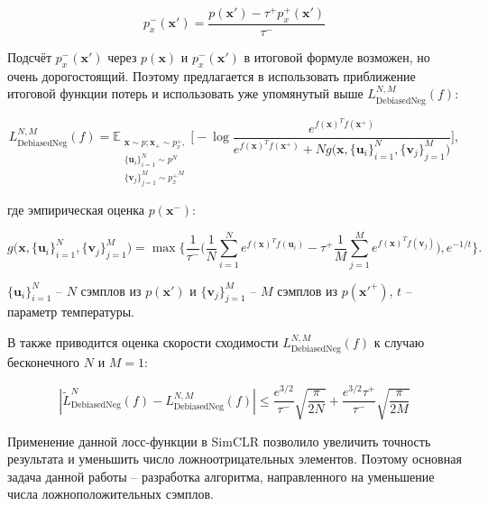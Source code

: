 \documentclass[a4paper, 12pt]{article}
\begin{document}
\begin{equation} \label{eq:4}
p_x^-(\textbf{x}') = \frac{p(\textbf{x}') - \tau^+ p^+_x(\textbf{x}')}{\tau^-}
\end{equation}

Подсчёт $p^-_x(\textbf{x}')$ через $p(\mathbf{x})$ и $p^-_x(\textbf{x}')$ в итоговой формуле возможен, но очень дорогостоящий. Поэтому предлагается в \citep{chuang2020debiased} использовать приближение итоговой функции потерь и использовать уже упомянутый выше $L_{\text{DebiasedNeg}}^{N, M}(f)$:

\begin{equation}\label{eq:5}
L_{\text{DebiasedNeg}}^{N, M}(f) = \mathbb{E}_{\substack{\textbf{x} \sim p; \textbf{x}_+ \sim p_x^+,\\ \{\textbf{u}_i\}_{i=1}^N \sim p^N \\ \{\textbf{v}_j\}_{j=1}^M \sim {p_x^+}^M}}  \bigg[ -\log \frac{e^{f(\textbf{x})^T f(\textbf{x}^+)} }{e^{f(\textbf{x})^T f(\textbf{x}^+)} + N g\big(\textbf{x}, \{\textbf{u}_i\}_{i=1}^N, \{\textbf{v}_j\}_{j=1}^M\big)} \bigg],
\end{equation}

\noindent где эмпирическая оценка $p(\mathbf{x}^-)$:

\begin{equation}\label{eq:6}
g\big(\textbf{x}, \{\textbf{u}_i\}_{i=1}^N, \{\textbf{v}_j\}_{j=1}^M\big) = \max \bigg\{ \frac{1}{\tau^-}\bigg(\frac{1}{N} \sum \limits_{i=1}^N e^{f(\textbf{x})^T f(\textbf{u}_i)} - \tau^+ \frac{1}{M} \sum \limits_{j=1}^M e^{f(\textbf{x})^T f(\textbf{v}_j)}\bigg), e^{-1/t}\bigg\}.
\end{equation}

$\{\textbf{u}_i\}_{i=1}^N$ -- $N$ сэмплов из $p(\mathbf{x'})$ и $\{\textbf{v}_j\}_{j=1}^M$ -- $M$ сэмплов из $p(\mathbf{x'}^+)$, $t$ -- параметр температуры.

В \citep{chuang2020debiased} также приводится оценка скорости сходимости $L_{\text{DebiasedNeg}}^{N, M}(f)$ к случаю бесконечного $N$ и $M = 1$:

\begin{equation}\label{eq:102}
|\tilde{L}_{\text{DebiasedNeg}}^N(f) - L_{\text{DebiasedNeg}}^{N, M}(f)| \leq \frac{e^{3/2}}{\tau^-}\sqrt{\frac{\pi}{2N}} + \frac{e^{3/2}\tau^+}{\tau^-}\sqrt{\frac{\pi}{2M}}
\end{equation}

Применение данной лосс-функции в SimCLR позволило увеличить точность результата и уменьшить число ложноотрицательных элементов. Поэтому основная задача данной работы -- разработка алгоритма, направленного на уменьшение числа ложноположительных сэмплов.
\end{document}
